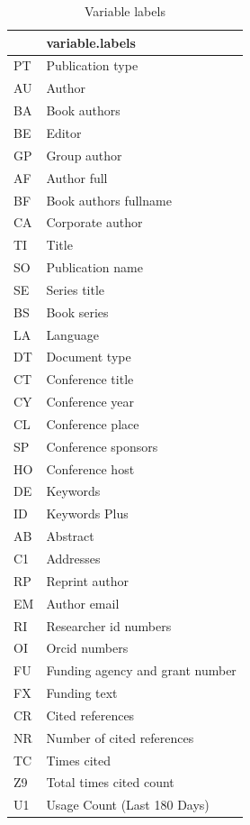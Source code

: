 \documentclass[
]{book}
\begin{document}
\begin{table}

\caption{\label{tab:unnamed-chunk-69}Variable labels}
\centering
\begin{tabular}[t]{l|l}
\hline
  & variable.labels\\
\hline
PT & Publication type\\
\hline
AU & Author\\
\hline
BA & Book authors\\
\hline
BE & Editor\\
\hline
GP & Group author\\
\hline
AF & Author full\\
\hline
BF & Book authors fullname\\
\hline
CA & Corporate author\\
\hline
TI & Title\\
\hline
SO & Publication name\\
\hline
SE & Series title\\
\hline
BS & Book series\\
\hline
LA & Language\\
\hline
DT & Document type\\
\hline
CT & Conference title\\
\hline
CY & Conference year\\
\hline
CL & Conference place\\
\hline
SP & Conference sponsors\\
\hline
HO & Conference host\\
\hline
DE & Keywords\\
\hline
ID & Keywords Plus\\
\hline
AB & Abstract\\
\hline
C1 & Addresses\\
\hline
RP & Reprint author\\
\hline
EM & Author email\\
\hline
RI & Researcher id numbers\\
\hline
OI & Orcid numbers\\
\hline
FU & Funding agency and grant number\\
\hline
FX & Funding text\\
\hline
CR & Cited references\\
\hline
NR & Number of cited references\\
\hline
TC & Times cited\\
\hline
Z9 & Total times cited count\\
\hline
U1 & Usage Count (Last 180 Days)\\

\end{tabular}
\end{table}
\end{document}

